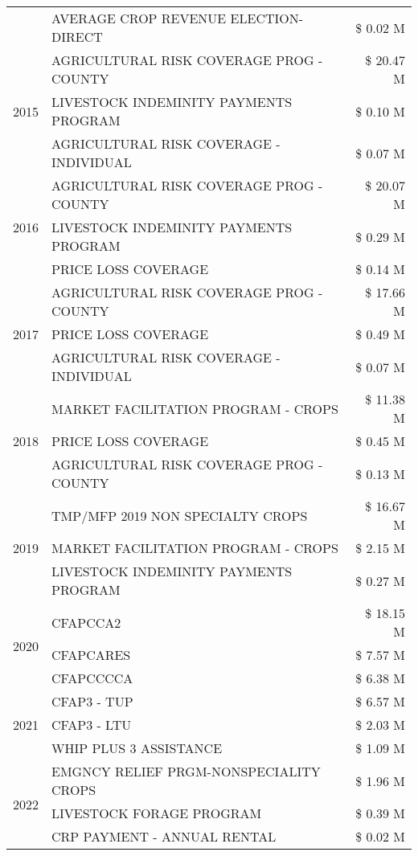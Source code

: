 \begin{tabular}{llr}
 & AVERAGE CROP REVENUE ELECTION-DIRECT & \$ 0.02 M \\
\cline{1-3}
\multirow[t]{3}{*}{2015} & AGRICULTURAL RISK COVERAGE PROG - COUNTY & \$ 20.47 M \\
 & LIVESTOCK INDEMINITY PAYMENTS PROGRAM & \$ 0.10 M \\
 & AGRICULTURAL RISK COVERAGE - INDIVIDUAL & \$ 0.07 M \\
\cline{1-3}
\multirow[t]{3}{*}{2016} & AGRICULTURAL RISK COVERAGE PROG - COUNTY & \$ 20.07 M \\
 & LIVESTOCK INDEMINITY PAYMENTS PROGRAM & \$ 0.29 M \\
 & PRICE LOSS COVERAGE & \$ 0.14 M \\
\cline{1-3}
\multirow[t]{3}{*}{2017} & AGRICULTURAL RISK COVERAGE PROG - COUNTY & \$ 17.66 M \\
 & PRICE LOSS COVERAGE & \$ 0.49 M \\
 & AGRICULTURAL RISK COVERAGE - INDIVIDUAL & \$ 0.07 M \\
\cline{1-3}
\multirow[t]{3}{*}{2018} & MARKET FACILITATION PROGRAM - CROPS & \$ 11.38 M \\
 & PRICE LOSS COVERAGE & \$ 0.45 M \\
 & AGRICULTURAL RISK COVERAGE PROG - COUNTY & \$ 0.13 M \\
\cline{1-3}
\multirow[t]{3}{*}{2019} & TMP/MFP 2019 NON SPECIALTY CROPS & \$ 16.67 M \\
 & MARKET FACILITATION PROGRAM - CROPS & \$ 2.15 M \\
 & LIVESTOCK INDEMINITY PAYMENTS PROGRAM & \$ 0.27 M \\
\cline{1-3}
\multirow[t]{3}{*}{2020} & CFAPCCA2 & \$ 18.15 M \\
 & CFAPCARES & \$ 7.57 M \\
 & CFAPCCCCA & \$ 6.38 M \\
\cline{1-3}
\multirow[t]{3}{*}{2021} & CFAP3 - TUP & \$ 6.57 M \\
 & CFAP3 - LTU & \$ 2.03 M \\
 & WHIP PLUS 3 ASSISTANCE & \$ 1.09 M \\
\cline{1-3}
\multirow[t]{3}{*}{2022} & EMGNCY RELIEF PRGM-NONSPECIALITY CROPS & \$ 1.96 M \\
 & LIVESTOCK FORAGE PROGRAM & \$ 0.39 M \\
 & CRP PAYMENT - ANNUAL RENTAL & \$ 0.02 M \\
\cline{1-3}
\bottomrule
\end{tabular}

